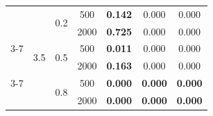 \documentclass[12pt]{article}
\numberwithin{equation}{section}
\begin{document}
\begin{table}[H]
\begin{tabular}{ccccccc}
& \multirow{6}{*}{3.5}
& \multirow{2}{*}{0.2}
& 500  & \textbf{0.142} & 0.000 & 0.000 \\
&  &  & 2000 & \textbf{0.725} & 0.000 & 0.000 \\
\cline{3-7}
&  & \multirow{2}{*}{0.5}
& 500  & \textbf{0.011} & 0.000 & 0.000 \\
&  &  & 2000 & \textbf{0.163} & 0.000 & 0.000 \\
\cline{3-7}
&  & \multirow{2}{*}{0.8}
& 500  & \textbf{0.000} & \textbf{0.000} & \textbf{0.000} \\
&  &  & 2000 & \textbf{0.000} & \textbf{0.000} & \textbf{0.000} \\
\hline

\end{tabular}
\end{table}
%
\end{document}

